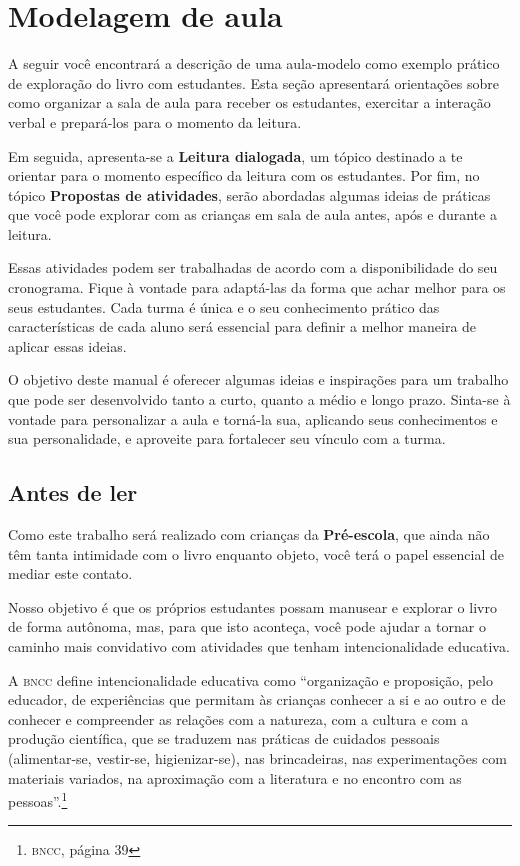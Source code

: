 \documentclass[11pt]{extarticle}
\begin{document}
\section{Modelagem de aula}
A seguir você encontrará a descrição de uma aula-modelo como exemplo 
prático de exploração do livro com estudantes. Esta seção apresentará 
orientações sobre como organizar a sala de aula para receber os 
estudantes, exercitar a interação verbal e prepará-los para o 
momento da leitura.

Em seguida, apresenta-se a \textbf{Leitura dialogada}, um 
tópico destinado a te orientar para o momento específico da 
leitura com os estudantes. Por fim, no tópico 
\textbf{Propostas de atividades}, serão abordadas algumas ideias 
de práticas que você pode explorar com as crianças em sala de 
aula antes, após e durante a leitura. 

Essas atividades podem ser trabalhadas de acordo com a 
disponibilidade do seu cronograma. Fique à vontade para adaptá-las 
da forma que achar melhor para os seus estudantes. Cada turma é única 
e o seu conhecimento prático das características de cada aluno será 
essencial para definir a melhor maneira de aplicar essas ideias. 

O objetivo deste manual é oferecer algumas ideias 
e inspirações para um trabalho que pode ser desenvolvido tanto 
a curto, quanto a médio e longo prazo. Sinta-se à vontade para 
personalizar a aula e torná-la sua, aplicando seus conhecimentos e sua 
personalidade, e aproveite para fortalecer 
seu vínculo com a turma.


\subsection{Antes de ler}


Como este trabalho será realizado com crianças da \textbf{Pré-escola}, 
que ainda não têm tanta intimidade com o livro enquanto objeto, você terá o 
papel essencial de mediar este contato. 

Nosso objetivo é que os próprios estudantes possam manusear 
e explorar o livro de forma autônoma, mas, para que isto aconteça, você 
pode ajudar a tornar o caminho mais convidativo com atividades que tenham 
intencionalidade educativa. 

A \textsc{bncc} define intencionalidade educativa como ``organização 
e proposição, pelo educador, de experiências que permitam às crianças 
conhecer a si e ao outro e de conhecer e compreender as relações com a 
natureza, com a cultura e com a produção científica, que se traduzem nas 
práticas de cuidados pessoais (alimentar-se, vestir-se, higienizar-se), 
nas brincadeiras, nas experimentações com materiais 
variados, na aproximação com a literatura e no encontro com as 
pessoas''.\footnote{\textsc{bncc}, página 39}
\end{document}
